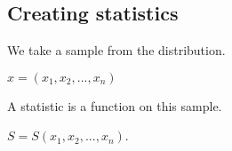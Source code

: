 
\subsection{Creating statistics}

We take a sample from the distribution.

\(x=(x_1, x_2,...,x_n)\)

A statistic is a function on this sample.

\(S=S(x_1, x_2,...,x_n)\).

